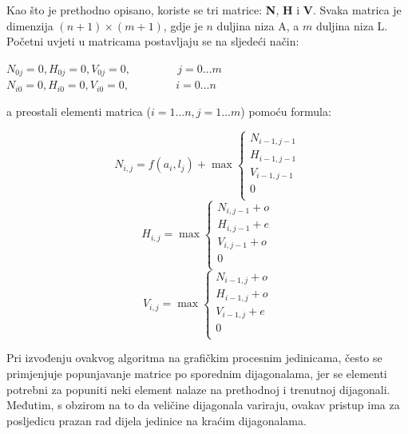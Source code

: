 \documentclass[times, utf8, zavrsni, numeric]{fer}
\begin{document}
Kao što je prethodno opisano, koriste se tri matrice: \textbf{N}, \textbf{H} i \textbf{V}. Svaka matrica je dimenzija $(n + 1) \times (m + 1)$, gdje je $n$ duljina niza A, a $m$ duljina niza L. Početni uvjeti u matricama postavljaju se na sljedeći način:
\begin{center}
$N_{0j} = 0, H_{0j} = 0, V_{0j} = 0,\hspace{50pt} j = 0...m$\\
$N_{i0} = 0, H_{i0} = 0, V_{i0} = 0,\hspace{50pt} i = 0...n$\\
\end{center}
a preostali elementi matrica ($i = 1...n, j = 1...m$) pomoću formula:
\begin{center}
\begin{equation}
N_{i, j} = f(a_{i}, l_{j}) + \max
\left\{
	\begin{array}{lr}
	N_{i - 1, j - 1} \\	
	H_{i - 1, j - 1} \\
	V_{i - 1, j - 1} \\
	0\\
	\end{array}
\right.
\end{equation}
\begin{equation}
H_{i, j} = \max \left\{
	\begin{array}{lr}
	N_{i, j - 1} + o\\	
	H_{i, j - 1} + e\\
	V_{i, j - 1} + o\\
	0\\
	\end{array}
\right.
\end{equation}
\begin{equation}
V_{i, j} = \max \left\{
	\begin{array}{lr}
	N_{i - 1, j} + o \\	
	H_{i - 1, j} + o\\
	V_{i - 1, j} + e \\
	0\\
	\end{array}
\right.
\end{equation}
\end{center}

Pri izvođenju ovakvog algoritma na grafičkim procesnim jedinicama, često se primjenjuje popunjavanje matrice po sporednim dijagonalama, jer se elementi potrebni za popuniti neki element nalaze na prethodnoj i trenutnoj dijagonali. Međutim, s obzirom na to da veličine dijagonala variraju, ovakav pristup ima za posljedicu prazan rad dijela jedinice na kraćim dijagonalama.
\end{document}
